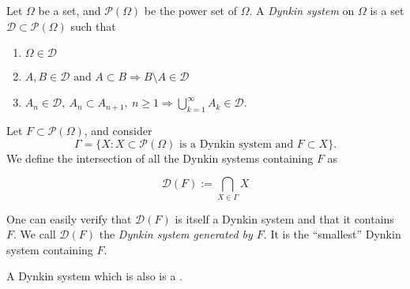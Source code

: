 \documentclass{article}
\newcommand{\defined}{:=}
\newcommand{\set}[1]{\{#1\}}
\newcommand{\powerset}[1]{\mathcal{P}(#1)}
\begin{document}
Let $\Omega$ be a set, and $\powerset{\Omega}$ be the power set of $\Omega$.  A \emph{Dynkin system} on $\Omega$ is a set $\mathcal{D} \subset \powerset{\Omega}$ such that

\begin{enumerate}
\item{$\Omega \in \mathcal{D}$}
\item{$A,B \in \mathcal{D} \text{ and } A \subset B \Rightarrow B \setminus A \in \mathcal{D}$}
\item{$A_n \in \mathcal{D},\ A_n \subset A_{n+1},\ n \ge 1 \Rightarrow \bigcup_{k=1}^{\infty}A_k \in \mathcal{D}$}.
\end{enumerate}

Let $F \subset \powerset{\Omega}$, and consider
\begin{equation}
\Gamma = \set{X : X\subset\powerset{\Omega} \text{ is a Dynkin system and } F \subset X}.
\end{equation}
We define the intersection of all the Dynkin systems containing $F$ as

\begin{equation}
\mathcal{D}(F) \defined \bigcap_{X \in \Gamma} X
\end{equation}

One can easily verify that $\mathcal{D}(F)$ is itself a Dynkin system and that it contains $F$.  We call $\mathcal{D}(F)$ the \emph{Dynkin system generated by $F$}.  It is the ``smallest'' Dynkin system containing $F$.

A Dynkin system which is also  is a .
\end{document}
